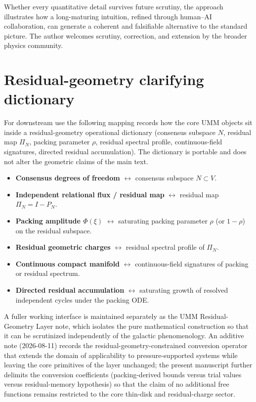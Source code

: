 \documentclass[11pt,a4paper]{article}
\begin{document}
Whether every quantitative detail survives future scrutiny, the approach illustrates how a long-maturing intuition, refined through human--AI collaboration, can generate a coherent and falsifiable alternative to the standard picture. The author welcomes scrutiny, correction, and extension by the broader physics community.

\appendix
\section{Residual-geometry clarifying dictionary}
\label{app:residual-dict}

For downstream use the following mapping records how the core UMM objects sit inside a residual-geometry operational dictionary (consensus subspace \(N\), residual map \(\Pi_N\), packing parameter \(\rho\), residual spectral profile, continuous-field signatures, directed residual accumulation). The dictionary is portable and does not alter the geometric claims of the main text.

\begin{itemize}[leftmargin=*]
\item \textbf{Consensus degrees of freedom} \(\leftrightarrow\) consensus subspace \(N\subset V\).
\item \textbf{Independent relational flux / residual map} \(\leftrightarrow\) residual map \(\Pi_N = I - P_N\).
\item \textbf{Packing amplitude \(\Phi(\xi)\)} \(\leftrightarrow\) saturating packing parameter \(\rho\) (or \(1-\rho\)) on the residual subspace.
\item \textbf{Residual geometric charges} \(\leftrightarrow\) residual spectral profile of \(\Pi_N\).
\item \textbf{Continuous compact manifold} \(\leftrightarrow\) continuous-field signatures of packing or residual spectrum.
\item \textbf{Directed residual accumulation} \(\leftrightarrow\) saturating growth of resolved independent cycles under the packing ODE.
\end{itemize}

A fuller working interface is maintained separately as the UMM Residual-Geometry Layer note, which isolates the pure mathematical construction so that it can be scrutinized independently of the galactic phenomenology. An additive note (2026-08-11) records the residual-geometry-constrained conversion operator that extends the domain of applicability to pressure-supported systems while leaving the core primitives of the layer unchanged; the present manuscript further delimits the conversion coefficients (packing-derived bounds versus trial values versus residual-memory hypothesis) so that the claim of no additional free functions remains restricted to the core thin-disk and residual-charge sector.
\end{document}

